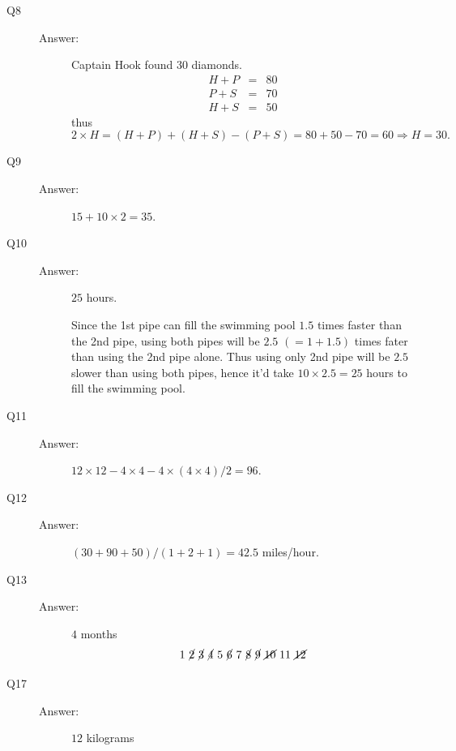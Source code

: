 \documentclass{article}
\begin{document}
\begin{description}
\item[Q8]
\begin{description}
\item[Answer:] Captain Hook found $30$ diamonds.
\begin{eqnarray*}
H + P &=& 80
\\
P + S &=& 70
\\
H + S &=& 50
\end{eqnarray*}
thus
\[
2 \times H = (H+P) + (H+S) - (P+S) = 80+50-70 = 60
\Rightarrow H = 30.
\]
\end{description}


\item[Q9]
\begin{description}
\item[Answer:] $15 + 10 \times 2 = 35$.
\end{description}


\item[Q10]
\begin{description}
\item[Answer:] $25$ hours.

Since the 1st pipe can fill the swimming pool $1.5$ times faster than the 2nd pipe,
using both pipes will be $2.5$ $(=1 + 1.5)$ times fater than using the 2nd pipe alone.
Thus using only 2nd pipe will be $2.5$ slower than using both pipes, hence it'd take $10 \times 2.5 = 25$ hours to fill the swimming pool.
\end{description}


\item[Q11]
\begin{description}
\item[Answer:] $12 \times 12 - 4 \times 4 - 4 \times (4\times 4)/2 = 96$.
\end{description}


\item[Q12]
\begin{description}
\item[Answer:] $(30+90+50)/(1+2+1) = 42.5$ miles/hour.
\end{description}


\item[Q13]
\begin{description}
\item[Answer:] $4$ months
\[
1\ \cancel{2}\ \cancel{3}\ \cancel{4}\ 5\ \cancel{6}\ 7\ \cancel{8}\ \cancel{9}\ \cancel{10}\ 11\ \cancel{12}
\]
\end{description}


\item[Q17]
\begin{description}
\item[Answer:] $12$ kilograms



\end{description}
\end{description}
\end{document}
